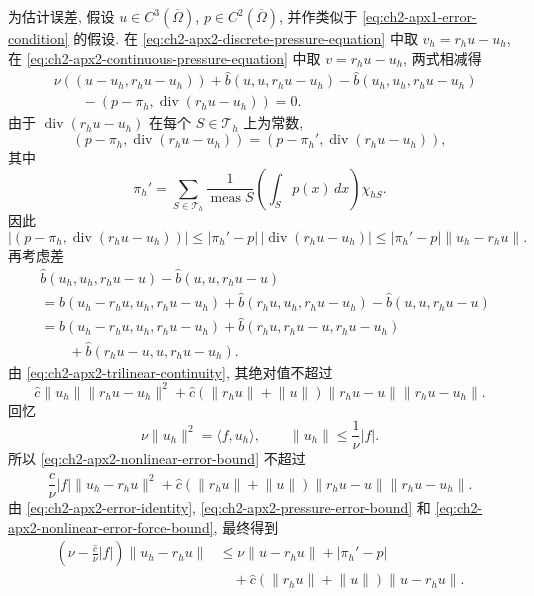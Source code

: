 为估计误差, 假设 $u\in C^3(\overline\Omega)$, $p\in C^2(\overline\Omega)$, 并作类似于 \eqref{eq:ch2-apx1-error-condition} 的假设. 在 \eqref{eq:ch2-apx2-discrete-pressure-equation} 中取 $v_h=r_hu-u_h$, 在 \eqref{eq:ch2-apx2-continuous-pressure-equation} 中取 $v=r_hu-u_h$, 两式相减得
\begin{equation}
\begin{aligned}
&\nu((u-u_h,r_hu-u_h))
+\widehat b(u,u,r_hu-u_h)-\widehat b(u_h,u_h,r_hu-u_h)\\
&\qquad-(p-\pi_h,\operatorname{div}(r_hu-u_h))=0.
\end{aligned}
\label{eq:ch2-apx2-error-identity}
\end{equation}
由于 $\operatorname{div}(r_hu-u_h)$ 在每个 $S\in\mathcal T_h$ 上为常数,
\[
(p-\pi_h,\operatorname{div}(r_hu-u_h))
=(p-\pi_h',\operatorname{div}(r_hu-u_h)),
\]
其中
\begin{equation}
\pi_h'=\sum_{S\in\mathcal T_h}
\frac1{\operatorname{meas}S}\left(\int_Sp(x)\,dx\right)\chi_{hS}.
\label{eq:ch2-apx2-cell-average-pressure}
\end{equation}
因此
\begin{equation}
|(p-\pi_h,\operatorname{div}(r_hu-u_h))|
\leq|\pi_h'-p|\,|\operatorname{div}(r_hu-u_h)|
\leq|\pi_h'-p|\lVert u_h-r_hu\rVert.
\label{eq:ch2-apx2-pressure-error-bound}
\end{equation}
再考虑差
\[
\begin{aligned}
&\widehat b(u_h,u_h,r_hu-u)-\widehat b(u,u,r_hu-u)\\
&=\widehat b(u_h-r_hu,u_h,r_hu-u_h)
+\widehat b(r_hu,u_h,r_hu-u_h)-\widehat b(u,u,r_hu-u)\\
&=\widehat b(u_h-r_hu,u_h,r_hu-u_h)
+\widehat b(r_hu,r_hu-u,r_hu-u_h)\\
&\qquad+\widehat b(r_hu-u,u,r_hu-u_h).
\end{aligned}
\]
由 \eqref{eq:ch2-apx2-trilinear-continuity}, 其绝对值不超过
\begin{equation}
\widehat c\lVert u_h\rVert\lVert r_hu-u_h\rVert^2
+\widehat c(\lVert r_hu\rVert+\lVert u\rVert)
\lVert r_hu-u\rVert\lVert r_hu-u_h\rVert.
\label{eq:ch2-apx2-nonlinear-error-bound}
\end{equation}
回忆
\[
\nu\lVert u_h\rVert^2=\langle f,u_h\rangle,
\qquad
\lVert u_h\rVert\leq\frac1\nu|f|.
\]
所以 \eqref{eq:ch2-apx2-nonlinear-error-bound} 不超过
\begin{equation}
\frac{\widehat c}{\nu}|f|\lVert u_h-r_hu\rVert^2
+\widehat c(\lVert r_hu\rVert+\lVert u\rVert)
\lVert r_hu-u\rVert\lVert r_hu-u_h\rVert.
\label{eq:ch2-apx2-nonlinear-error-force-bound}
\end{equation}
由 \eqref{eq:ch2-apx2-error-identity}, \eqref{eq:ch2-apx2-pressure-error-bound} 和 \eqref{eq:ch2-apx2-nonlinear-error-force-bound}, 最终得到
\begin{equation}
\begin{aligned}
\left(\nu-\frac{\widehat c}{\nu}|f|\right)\lVert u_h-r_hu\rVert
&\leq\nu\lVert u-r_hu\rVert+|\pi_h'-p|\\
&\quad+\widehat c(\lVert r_hu\rVert+\lVert u\rVert)\lVert u-r_hu\rVert.
\end{aligned}
\label{eq:ch2-apx2-final-error-bound}
\end{equation}

